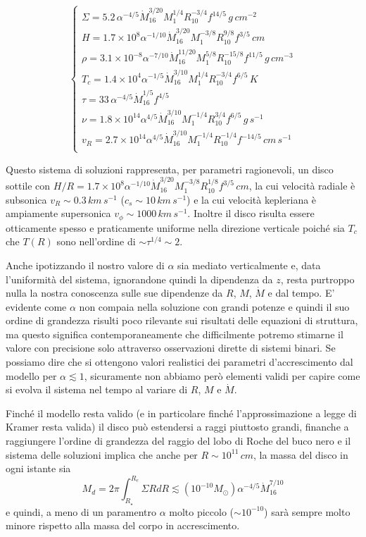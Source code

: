 \documentclass[a4paperbi]{article}
\begin{document}
\begin{equation}
	\begin{cases}
		\Sigma=5.2\,\alpha^{-4/5}\dot{M}_{16}^{3/20}M^{1/4}_1R_{10}^{-3/4}f^{14/5}\,g\,cm^{-2}\\
		H=1.7\times10^8\alpha^{-1/10}\dot{M}^{3/20}_{16}M^{-3/8}_1R_{10}^{9/8}f^{3/5}\,cm\\
		\rho=3.1\times10^{-8}\alpha^{-7/10}\dot{M}^{11/20}_{16}M^{5/8}_1R_{10}^{-15/8}f^{11/5}\,g\,cm^{-3}\\
		T_c=1.4\times10^{4}\alpha^{-1/5}\dot{M}^{3/10}_{16}M^{1/4}_1R_{10}^{-3/4}f^{6/5}\,K\\
		\tau=33\,\alpha^{-4/5}\dot{M}^{1/5}_{16}f^{4/5}\\
		\nu=1.8\times10^{14}\alpha^{4/5}\dot{M}^{3/10}_{16}M^{-1/4}_1R_{10}^{3/4}f^{6/5}\,g\,s^{-1}\\
		v_R=2.7\times10^{14}\alpha^{4/5}\dot{M}^{3/10}_{16}M^{-1/4}_1R_{10}^{-1/4}f^{-14/5}\,cm\,s^{-1}\\
	\end{cases}
\end{equation}

	Questo sistema di soluzioni rappresenta, per parametri ragionevoli, un disco sottile con $H/R=1.7\times10^8\alpha^{-1/10}\dot{M}^{3/20}_{16}M^{-3/8}_1R_{10}^{1/8}f^{3/5}\,cm$, la cui velocità radiale è subsonica $v_R\sim 0.3\,km\,s^{-1}$ ($c_s\sim10\,km\,s^{-1}$) e la cui velocità kepleriana è ampiamente supersonica $v_\phi\sim1000\,km\,s^{-1}$. Inoltre il disco risulta essere otticamente spesso e praticamente uniforme nella direzione verticale poiché sia $T_c$ che $T(R)$ sono nell'ordine di $\sim\tau^{1/4}\sim2$.

	Anche ipotizzando il nostro valore di $\alpha$ sia mediato verticalmente e, data l'uniformità del sistema, ignorandone quindi la dipendenza da $z$, resta purtroppo nulla la nostra conoscenza sulle sue dipendenze da $R$, $M$, $\dot{M}$ e dal tempo.
	E' evidente come $\alpha$ non compaia nella soluzione con grandi potenze e quindi il suo ordine di grandezza risulti poco rilevante sui risultati delle equazioni di struttura, ma questo significa contemporaneamente che difficilmente potremo stimarne il valore con precisione solo attraverso osservazioni dirette di sistemi binari. 	
	Se possiamo dire che si ottengono valori realistici dei parametri d'accrescimento dal modello per $\alpha\lesssim1$, sicuramente non abbiamo però elementi validi per capire come si evolva il sistema nel tempo al variare di $R$, $M$ e $\dot{M}$.
	
	Finché il modello resta valido (e in particolare finché l'approssimazione a legge di Kramer resta valida) il disco può estendersi a raggi piuttosto grandi, finanche a raggiungere l'ordine di grandezza del raggio del lobo di Roche del buco nero e il sistema delle soluzioni implica che anche per $R\sim10^{11}\,cm$, la massa del disco in ogni istante sia
	\begin{equation}
		M_d=2\pi\int^{R_{e}}_{R_\star}\Sigma RdR\lesssim (10^{-10}M_\odot)\alpha^{-4/5}\dot{M}^{7/10}_16
	\end{equation}
	e quindi, a meno di un paramentro $\alpha$ molto piccolo ($\sim10^{-10}$) sarà sempre molto minore rispetto alla massa del corpo in accrescimento.
	
\end{document}
